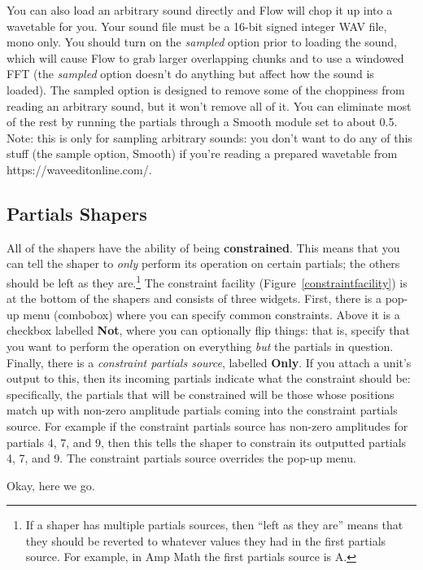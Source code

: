 \documentclass{article}
\begin{document}
You can also load an arbitrary sound directly and Flow will chop it up into a wavetable for you.  Your sound file must be a 16-bit signed integer WAV file, mono only.  You should turn on the {\it sampled} option prior to loading the sound, which will cause Flow to grab larger overlapping chunks and to use a windowed FFT (the {\it sampled} option doesn't do anything but affect how the sound is loaded).  The sampled option is designed to remove some of the choppiness from reading an arbitrary sound, but it won't remove all of it.  You can eliminate most of the rest by running the partials through a Smooth module set to about 0.5.  Note: this is only for sampling arbitrary sounds:  you don't want to do any of this stuff (the sample option, Smooth) if you're reading a prepared wavetable from https:/\!/waveeditonline.com/.


\subsection{Partials Shapers}
\label{unitshapers}


All of the shapers have the ability of being {\bf constrained}.  This means that you can tell the shaper to {\it only} perform its operation on certain partials; the others should be left as they are.\footnote{If a shaper has multiple partials sources, then ``left as they are'' means that they should be reverted to whatever values they had in the first partials source.  For example, in Amp Math the first partials source is A.}  The constraint facility (Figure~\ref{constraintfacility}) is at the bottom of the shapers and consists of three widgets.  First, there is a pop-up menu (combobox) where you can specify common constraints.  Above it is a checkbox labelled {\bf Not}, where you can optionally flip things: that is, specify that you want to perform the operation on everything {\it but} the partials in question.  Finally, there is a {\it constraint partials source}, labelled {\bf Only}. If you attach a unit's output to this, then its incoming partials indicate what the constraint should be: specifically, the partials that will be constrained will be those whose positions match up with non-zero amplitude partials coming into the constraint partials source. For example if the constraint partials source has non-zero amplitudes for partials 4, 7, and 9, then this tells the shaper to constrain its outputted partials 4, 7, and 9.  The constraint partials source overrides the pop-up menu.

Okay, here we go.
\end{document}
